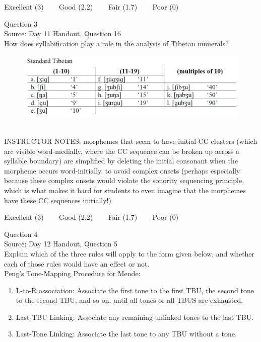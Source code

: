 \documentclass[12pt]{article}
\begin{document}
\vfill
Excellent (3) ~~~ Good (2.2) ~~~ Fair (1.7) ~~~ Poor (0)
\newpage

{\large Question 3}\\

Source: Day 11 Handout, Question 16\\

How does syllabification play a role in the analysis of Tibetan numerals?\\

\begin{figure}[H]
\includegraphics{../images/tibetan.png}
\end{figure}

~\\
INSTRUCTOR NOTES: morphemes that seem to have initial CC clusters (which are visible word-medially, where the CC sequence can be broken up across a syllable boundary) are simplified by deleting the initial consonant when the morpheme occurs word-initially, to avoid complex onsets (perhaps especially because these complex onsets would violate the sonority sequencing principle, which is what makes it hard for students to even imagine that the morphemes have these CC sequences initially!)


\vfill
Excellent (3) ~~~ Good (2.2) ~~~ Fair (1.7) ~~~ Poor (0)
\newpage

{\large Question 4}\\

Source: Day 12 Handout, Question 5\\

Explain which of the three rules will apply to the form given below, and whether each of those rules would have an effect or not.\\

Peng’s Tone-Mapping Procedure for Mende: \begin{enumerate} \item L-to-R association: Associate the first tone to the first TBU, the second tone to the second TBU, and so on, until all tones or all TBUS are exhausted. \item Last-TBU Linking: Associate any remaining unlinked tones to the last TBU. \item Last-Tone Linking: Associate the last tone to any TBU without a tone. \end{enumerate}
\end{document}
